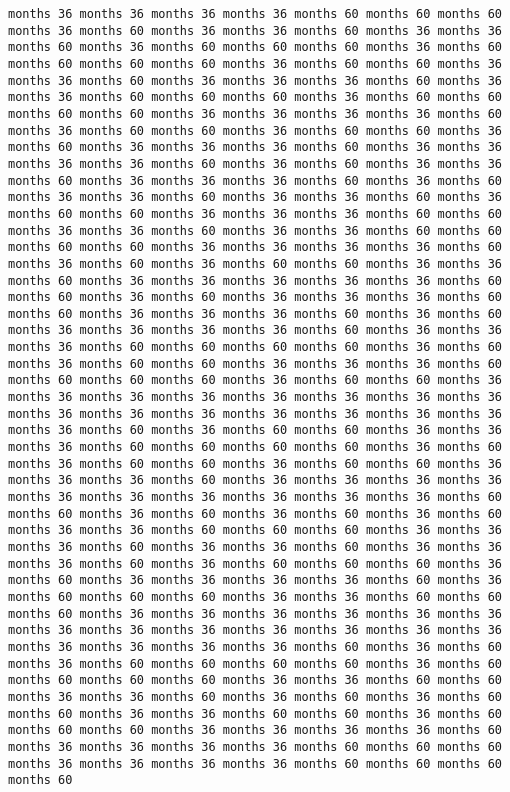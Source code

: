 \documentclass[11pt]{article}
\begin{document}
\begin{Verbatim}[commandchars=\\\{\}, frame=single, framerule=2mm, rulecolor=\color{outerrorbackground}]
months 36 months 36 months 36 months 36 months 60 months 60 months 60 months 36 months 60 months 36 months 36 months 60 months 36 months 36 months 60 months 36 months 60 months 60 months 60 months 36 months 60 months 60 months 60 months 60 months 36 months 60 months 60 months 36 months 36 months 60 months 36 months 36 months 36 months 60 months 36 months 36 months 60 months 60 months 60 months 36 months 60 months 60 months 60 months 60 months 36 months 36 months 36 months 36 months 60 months 36 months 60 months 60 months 36 months 60 months 60 months 36 months 60 months 36 months 36 months 36 months 60 months 36 months 36 months 36 months 36 months 60 months 36 months 60 months 36 months 36 months 60 months 36 months 36 months 36 months 60 months 36 months 60 months 36 months 36 months 60 months 36 months 36 months 60 months 36 months 60 months 60 months 36 months 36 months 36 months 60 months 60 months 36 months 36 months 60 months 36 months 36 months 60 months 60 months 60 months 60 months 36 months 36 months 36 months 36 months 60 months 36 months 60 months 36 months 60 months 60 months 36 months 36 months 60 months 36 months 36 months 36 months 36 months 36 months 60 months 60 months 36 months 60 months 36 months 36 months 36 months 60 months 60 months 36 months 36 months 36 months 60 months 36 months 60 months 36 months 36 months 36 months 36 months 60 months 36 months 36 months 36 months 60 months 60 months 60 months 60 months 36 months 60 months 36 months 60 months 60 months 36 months 36 months 36 months 60 months 60 months 60 months 60 months 36 months 60 months 60 months 36 months 36 months 36 months 36 months 36 months 36 months 36 months 36 months 36 months 36 months 36 months 36 months 36 months 36 months 36 months 36 months 60 months 36 months 60 months 60 months 36 months 36 months 36 months 60 months 60 months 60 months 60 months 36 months 60 months 36 months 60 months 60 months 36 months 60 months 60 months 36 months 36 months 36 months 60 months 36 months 36 months 36 months 36 months 36 months 36 months 36 months 36 months 36 months 36 months 60 months 60 months 36 months 60 months 36 months 60 months 36 months 60 months 36 months 36 months 60 months 60 months 60 months 36 months 36 months 36 months 60 months 36 months 36 months 60 months 36 months 36 months 36 months 60 months 36 months 60 months 60 months 60 months 36 months 60 months 36 months 36 months 36 months 36 months 60 months 36 months 60 months 60 months 60 months 36 months 36 months 60 months 60 months 60 months 36 months 36 months 36 months 36 months 36 months 36 months 36 months 36 months 36 months 36 months 36 months 36 months 36 months 36 months 36 months 36 months 36 months 60 months 36 months 60 months 36 months 60 months 60 months 60 months 60 months 36 months 60 months 60 months 60 months 60 months 36 months 36 months 60 months 60 months 36 months 36 months 60 months 36 months 60 months 36 months 60 months 60 months 36 months 36 months 60 months 60 months 36 months 60 months 60 months 60 months 36 months 36 months 36 months 36 months 60 months 36 months 36 months 36 months 36 months 60 months 60 months 60 months 36 months 36 months 36 months 36 months 60 months 60 months 60 months 60 
\end{Verbatim}
\end{document}
